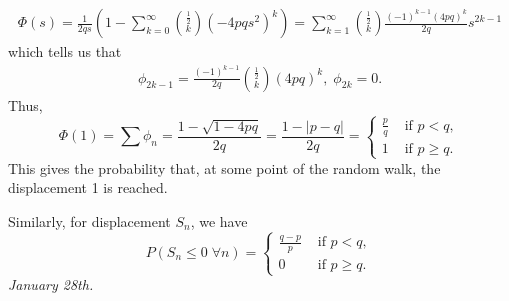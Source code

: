\documentclass[15pt,a4paper]{book}
\theoremstyle{definition}
\newcommand{\abs}[1]{\left| #1 \right|} %
\begin{document}
\begin{align}
    \Phi (s) = \frac{1}{2qs} \left( 1 - \sum_{k=0}^{\infty} \binom{\frac{1}{2}}{k} (-4pqs^{2})^{k}  \right) = \sum_{k=1}^{\infty} \binom{\frac{1}{2}}{k} \frac{(-1)^{k-1} (4pq)^{k}}{2q} s^{2k-1}
\end{align}
which tells us that
\begin{align}
    \phi_{2k-1} = \frac{(-1)^{k-1}}{2q} \binom{\frac{1}{2}}{k} (4pq)^{k}, \; \phi_{2k} = 0.
\end{align}
Thus,
\begin{equation*}
    \Phi (1) = \sum \phi_{n} = \frac{1-\sqrt{1-4pq}}{2q} = \frac{1-\abs{p-q}}{2q} = \begin{cases}
        \frac{p}{q} &\text{ if } p < q,\\
        1 &\text{ if } p \geq q.
    \end{cases}
\end{equation*}
This gives the probability that, at some point of the random walk, the displacement 1 is reached.

Similarly, for displacement $S_{n}$, we have
\begin{equation*}
    P(S_{n} \leq 0 \; \forall n) = \begin{cases}
        \frac{q-p}{p} &\text{ if } p < q,\\
        0 &\text{ if } p \geq q.
    \end{cases}
\end{equation*}
\textit{January 28th.}
\end{document}
